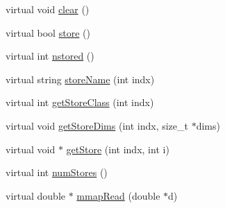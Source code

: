 \begin{DoxyCompactItemize}
virtual void \hyperlink{classShape_afc0a792fc9c31a0ae947f721c146f68b}{clear} ()
\item 
virtual bool \hyperlink{classShape_a9dea3f39fe203b2f4288dc7cda6295a7}{store} ()
\item 
virtual int \hyperlink{classShape_a92f5bc7b0179d1c47c2ae916727bf73d}{nstored} ()
\item 
virtual string \hyperlink{classShape_aaf3b0b140fcaf0bb11c28493ef745bfd}{store\-Name} (int indx)
\item 
virtual int \hyperlink{classShape_acf135c0569e45aa0fab16f748bee639e}{get\-Store\-Class} (int indx)
\item 
virtual void \hyperlink{classShape_afc3fbc26459718484ae4efe885f0fe37}{get\-Store\-Dims} (int indx, size\-\_\-t $\ast$dims)
\item 
virtual void $\ast$ \hyperlink{classShape_ae89da51d3c54b7b7139b8223103633e3}{get\-Store} (int indx, int i)
\item 
virtual int \hyperlink{classShape_a53bac379f3ad1537e56625015afd5c95}{num\-Stores} ()
\item 
virtual double $\ast$ \hyperlink{classShape_ae212539c5d1468805c155f4aed8367ea}{mmap\-Read} (double $\ast$d)
\end{DoxyCompactItemize}
